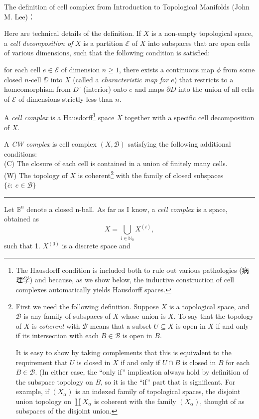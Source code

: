 The definition of cell complex from Introduction to Topological Manifolds (John M. Lee)：

   Here are technical details of the definition. If $X$ is a non-empty topological space, a {\it cell decomposition of} $X$ is a partition $\mathcal{E}$ of $X$ into subspaces that are open cells of various dimensions, such that the following condition is satisfied:
   
   for each cell $e\in \mathcal{E}$ of dimension $n\geq 1$, there exists a continuous map $\phi$
   from some closed $n$-cell $\DD$ into $X$ (called a {\it characteristic map for $e$}) that restricts to a homeomorphism from $D^{\circ}$ (interior) onto $e$ and maps $\partial D$ into the union of all cells of $\mathcal{E}$ of dimensions strictly less than $n$.\par
   A {\it cell complex} is a Hausdorff\footnote{The Hausdorff condition is included both to rule out various pathologies (病理学) and because, as we show below, the inductive construction of cell complexes automatically yields Hausdorff spaces.} space $X$ together with a specific cell decomposition of $X$.\par
   A {\it CW complex} is cell complex $(X,\mathcal{B})$ satisfying the following additional conditions:\\
   (C) The closure of each cell is contained in a union of finitely many cells.\\
   (W) The topology of $X$ is coherent\footnote{First we need the following definition. Suppose $X$ is a topological space, and $\mathcal{B}$ is any family of subspaces of $X$ whose union is $X$. To say that the topology of $X$ is {\it coherent} with $\mathcal{B}$ means that a subset $U\subseteq X$ is open in $X$ if and only if its intersection with each $B\in \mathcal{B}$ is open in $B$.\par 
   It is easy to show by taking complements that this is equivalent to the requirement that $U$ is closed in $X$ if and only if $U\cap B$ is closed in $B$ for each $B \in\mathcal{B}$. (In either case, the ``only if'' implication always hold by definition of the subspace topology on $B$, so it is the ``if'' part that is significant. For example, if $(X_{\alpha})$ is an indexed family of topological spaces, the disjoint union topology on $\coprod X_{\alpha}$ is coherent with the family $(X_{\alpha})$, thought of as subspaces of the disjoint union.} with the family of closed subspaces $\{\bar{e}:\ e\in \mathcal{B}\}$ \par
\vspace{3pt}
\hrule
\vspace{3pt}
Let $\mathbb{B}^n$ denote a closed n-ball. As far as I know, a {\it cell complex} is a space, obtained as \[X=\bigcup_{i\in\mathbb{N}_0} X^{(i)},\] 
such that
1. $X^{(0)}$ is a discrete space and

